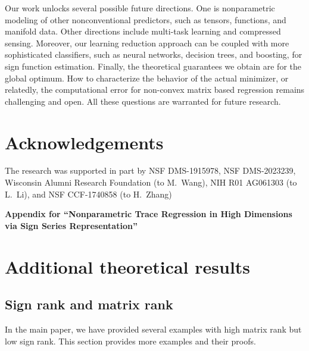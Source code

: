 \documentclass[11pt]{article}
\theoremstyle{plain}
\theoremstyle{definition}
\begin{document}
Our work unlocks several possible future directions. One is nonparametric modeling of other nonconventional predictors, such as tensors, functions, and manifold data. Other directions include multi-task learning and compressed sensing. Moreover, our learning reduction approach can be coupled with more sophisticated classifiers, such as neural networks, decision trees, and boosting, for sign function estimation. Finally, the theoretical guarantees we obtain are for the global optimum. How to characterize the behavior of the actual minimizer, or relatedly, the computational error for non-convex matrix based regression remains challenging and open. All these questions are warranted for future research. 





\section*{Acknowledgements}
The research was supported in part by NSF DMS-1915978, NSF DMS-2023239, Wisconsin Alumni Research Foundation (to M.\ Wang), NIH R01 AG061303 (to L.\ Li), and NSF CCF-1740858 (to H.\ Zhang)

 
    

\newpage
\appendix
\begin{center}
{\Large\bf Appendix for ``Nonparametric Trace Regression in High Dimensions via Sign Series Representation''}
\end{center}

\section{Additional theoretical results}\label{sec:additional}
\subsection{Sign rank and matrix rank}\label{sec:signrank}

In the main paper, we have provided several examples with high matrix rank but low sign rank. This section provides more examples and their proofs. 
\end{document}
